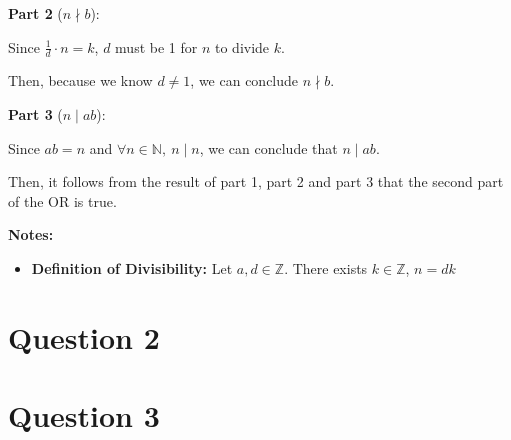 \documentclass[12pt]{article}
\begin{document}
\begin{enumerate}
    \bigskip

    \textbf{Part 2} ($n \nmid b$):

    Since $\frac{1}{d} \cdot n = k$, $d$ must be 1 for $n$ to divide $k$.

    \bigskip

    Then, because we know $d \neq 1$, we can conclude $n \nmid b$.

    \textbf{Part 3} ($n \mid ab$):

    Since $ab = n$ and $\forall n \in \mathbb{N},\:n \mid n$, we can conclude that $n \mid ab$.

    \bigskip

    Then, it follows from the result of part 1, part 2 and part 3 that the second
    part of the OR is true.

    \textbf{Notes:}
    \begin{itemize}
        \item \textbf{Definition of Divisibility:} Let $a,d \in \mathbb{Z}$. There exists $k \in \mathbb{Z}$, $n = dk$

    \end{itemize}


\end{enumerate}

\section*{Question 2}

\section*{Question 3}
\end{document}
